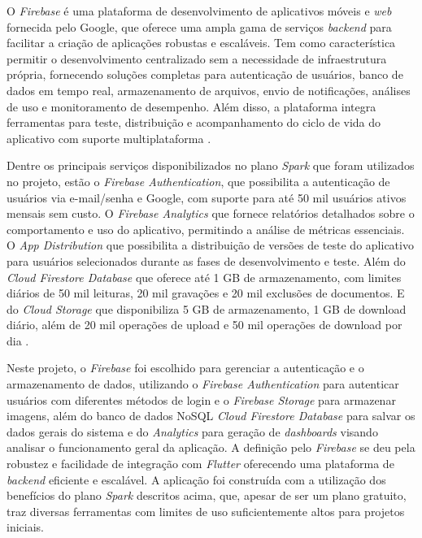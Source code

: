 O \textit{Firebase} é uma plataforma de desenvolvimento de aplicativos móveis e \textit{web} fornecida pelo Google, que oferece uma ampla gama de serviços \textit{backend} para facilitar a criação de aplicações robustas e escaláveis. Tem como característica permitir o desenvolvimento centralizado sem a necessidade de infraestrutura própria, fornecendo soluções completas para autenticação de usuários, banco de dados em tempo real, armazenamento de arquivos, envio de notificações, análises de uso e monitoramento de desempenho. Além disso, a plataforma integra ferramentas para teste, distribuição e acompanhamento do ciclo de vida do aplicativo com suporte multiplataforma \cite{firebase2025}.

Dentre os principais serviços disponibilizados no plano \textit{Spark} que foram utilizados no projeto, estão o \textit{Firebase Authentication}, que possibilita a autenticação de usuários via e-mail/senha e Google, com suporte para até 50 mil usuários ativos mensais sem custo. O \textit{Firebase Analytics} que fornece relatórios detalhados sobre o comportamento e uso do aplicativo, permitindo a análise de métricas essenciais. O \textit{App Distribution} que possibilita a distribuição de versões de teste do aplicativo para usuários selecionados durante as fases de desenvolvimento e teste. Além do \textit{Cloud Firestore Database} que oferece até 1 GB de armazenamento, com limites diários de 50 mil leituras, 20 mil gravações e 20 mil exclusões de documentos. E do \textit{Cloud Storage} que disponibiliza 5 GB de armazenamento, 1 GB de download diário, além de 20 mil operações de upload e 50 mil operações de download por dia \cite{firebase2025}.

Neste projeto, o \textit{Firebase} foi escolhido para gerenciar a autenticação e o armazenamento de 
dados, utilizando o \textit{Firebase Authentication} para autenticar usuários com diferentes métodos de login e o \textit{Firebase Storage} para armazenar imagens, além do banco de dados NoSQL \textit{Cloud Firestore Database} para salvar os dados gerais do sistema e do \textit{Analytics} para geração de \textit{dashboards} visando analisar o funcionamento geral da aplicação.
A definição pelo \textit{Firebase} se deu pela robustez e facilidade de integração com \textit{Flutter} oferecendo uma plataforma de \textit{backend} eficiente e escalável. A aplicação foi construída com a utilização dos benefícios do plano \textit{Spark} descritos acima, que, apesar de ser um plano gratuito, traz diversas ferramentas com limites de uso suficientemente altos para projetos iniciais.


